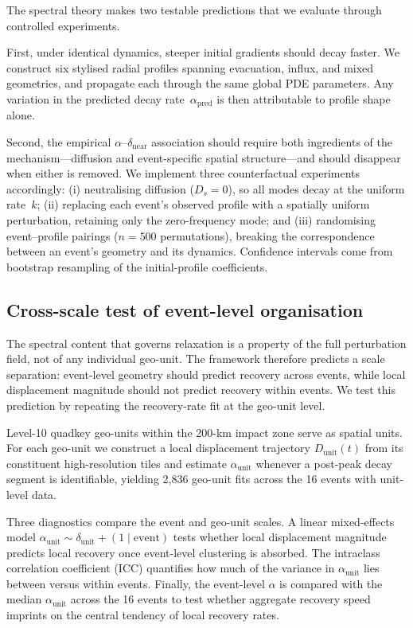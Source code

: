 \documentclass[11pt]{article}
\newcommand{\dnear}{\delta_{\mathrm{near}}}
\newcommand{\apred}{\alpha_{\mathrm{pred}}}
\newcommand{\Ds}{D_s}
\newcommand{\aunit}{\alpha_{\mathrm{unit}}}
\begin{document}
The spectral theory makes two testable predictions that we evaluate through controlled experiments.

First, under identical dynamics, steeper initial gradients should decay faster. We construct six stylised radial profiles spanning evacuation, influx, and mixed geometries, and propagate each through the same global PDE parameters. Any variation in the predicted decay rate~$\apred$ is then attributable to profile shape alone.

Second, the empirical $\alpha$--$\dnear$ association should require both ingredients of the mechanism---diffusion and event-specific spatial structure---and should disappear when either is removed. We implement three counterfactual experiments accordingly: (i) neutralising diffusion ($\Ds = 0$), so all modes decay at the uniform rate~$k$; (ii) replacing each event's observed profile with a spatially uniform perturbation, retaining only the zero-frequency mode; and (iii) randomising event--profile pairings ($n = 500$ permutations), breaking the correspondence between an event's geometry and its dynamics. Confidence intervals come from bootstrap resampling of the initial-profile coefficients.

\subsection*{Cross-scale test of event-level organisation}

The spectral content that governs relaxation is a property of the full perturbation field, not of any individual geo-unit. The framework therefore predicts a scale separation: event-level geometry should predict recovery across events, while local displacement magnitude should not predict recovery within events. We test this prediction by repeating the recovery-rate fit at the geo-unit level.

Level-10 quadkey geo-units within the 200-km impact zone serve as spatial units. For each geo-unit we construct a local displacement trajectory $D_{\mathrm{unit}}(t)$ from its constituent high-resolution tiles and estimate $\aunit$ whenever a post-peak decay segment is identifiable, yielding 2{,}836 geo-unit fits across the 16 events with unit-level data.

Three diagnostics compare the event and geo-unit scales. A linear mixed-effects model $\aunit \sim \delta_{\mathrm{unit}} + (1 \mid \mathrm{event})$ tests whether local displacement magnitude predicts local recovery once event-level clustering is absorbed. The intraclass correlation coefficient (ICC) quantifies how much of the variance in $\aunit$ lies between versus within events. Finally, the event-level $\alpha$ is compared with the median $\aunit$ across the 16 events to test whether aggregate recovery speed imprints on the central tendency of local recovery rates.
\end{document}
